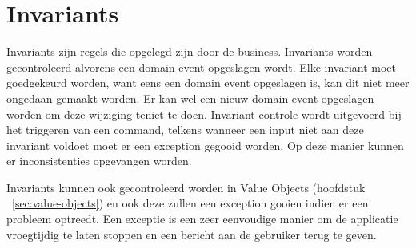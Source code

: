 
\section{Invariants}
\label{sec:invariants}

Invariants zijn regels die opgelegd zijn door de business. Invariants worden gecontroleerd alvorens een domain event opgeslagen wordt. Elke invariant moet goedgekeurd worden, want eens een domain event opgeslagen is, kan dit niet meer ongedaan gemaakt worden. Er kan wel een nieuw domain event opgeslagen worden om deze wijziging teniet te doen. Invariant controle wordt uitgevoerd bij het triggeren van een command, telkens wanneer een input niet aan deze invariant voldoet moet er een exception gegooid worden. Op deze manier kunnen er inconsistenties opgevangen worden.

Invariants kunnen ook gecontroleerd worden in Value Objects (hoofdstuk ~\ref{sec:value-objects}) en ook deze zullen een exception gooien indien er een probleem optreedt.
Een exceptie is een zeer eenvoudige manier om de applicatie vroegtijdig te laten stoppen en een bericht aan de gebruiker terug te geven.

